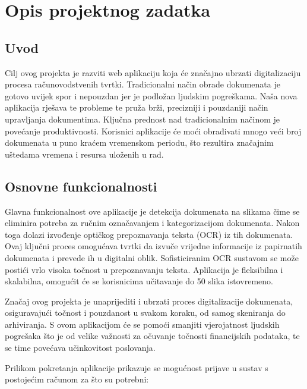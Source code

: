 \chapter{Opis projektnog zadatka}
				
		\section{Uvod}
		Cilj ovog projekta je razviti web aplikaciju koja će značajno ubrzati digitalizaciju procesa računovodstvenih tvrtki. Tradicionalni način obrade dokumenata je gotovo uvijek spor i nepouzdan jer je podložan ljudskim pogreškama. Naša nova aplikacija rješava te probleme te pruža brži, precizniji i pouzdaniji način upravljanja dokumentima. Ključna prednost nad tradicionalnim načinom je povećanje produktivnosti. Korisnici aplikacije će moći obrađivati mnogo veći broj dokumenata u puno kraćem vremenskom periodu, što rezultira značajnim uštedama vremena i resursa uloženih u rad.
		\section{Osnovne funkcionalnosti}
		Glavna funkcionalnost ove aplikacije je detekcija dokumenata na slikama čime se eliminira potreba za ručnim označavanjem i kategorizacijom dokumenata. Nakon toga dolazi izvođenje optičkog prepoznavanja teksta (OCR) iz tih dokumenata. Ovaj ključni proces omogućava tvrtki da izvuče vrijedne informacije iz papirnatih dokumenata i prevede ih u digitalni oblik. Sofisticiranim OCR sustavom se može postići vrlo visoka točnost u prepoznavanju teksta. Aplikacija je fleksibilna i skalabilna, omogućit će se korisnicima učitavanje do 50 slika istovremeno.
		
		Značaj ovog projekta je unaprijediti i ubrzati proces digitalizacije dokumenata, osiguravajući točnost i pouzdanost u svakom koraku, od samog skeniranja do arhiviranja. S ovom aplikacijom će se pomoći smanjiti vjerojatnost ljudskih pogrešaka što je od velike važnosti za očuvanje točnosti financijskih podataka, te se time povećava učinkovitost poslovanja.
		
		Prilikom pokretanja aplikacije prikazuje se mogućnost prijave u sustav s postojećim računom za što su potrebni:
		\begin{packed_item}
			\item {}
			\item {}
		\end{packed_item}

